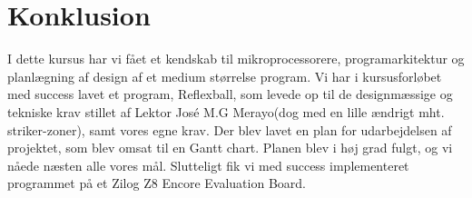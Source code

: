 \section{Konklusion}
I dette kursus har vi fået et kendskab til mikroprocessorere, programarkitektur og planlægning af design  af et medium størrelse program. Vi har i kursusforløbet med success lavet et program, Reflexball, som levede op til de designmæssige og tekniske krav  stillet af Lektor José M.G Merayo(dog med en lille ændrigt mht. striker-zoner), samt vores egne krav. Der blev lavet en plan for udarbejdelsen af projektet, som blev omsat til en Gantt chart. Planen blev i høj grad fulgt, og vi nåede næsten alle vores mål. Slutteligt fik vi med success implementeret programmet på et Zilog Z8 Encore Evaluation Board.